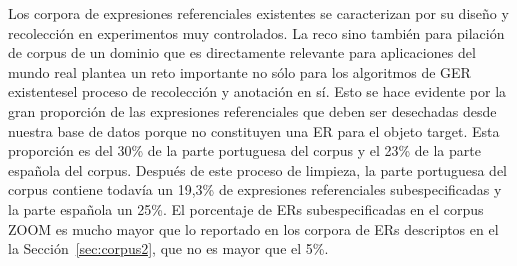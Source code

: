 


Los corpora de expresiones referenciales existentes se caracterizan por su dise\~no y recolecci\'on en experimentos muy controlados. La reco sino tambi\'en para pilaci\'on de corpus de un dominio que es directamente relevante para aplicaciones del mundo real plantea un reto importante no s\'olo para los algoritmos de GER existentesel proceso de recolecci\'on y anotaci\'on en s\'{i}. Esto se hace evidente por la gran proporci\'on de las expresiones referenciales que deben ser desechadas desde nuestra base de datos porque no constituyen una ER para el objeto target. Esta proporci\'on es del 30\% de la parte portuguesa del corpus y el 23\% de la parte espa\~nola del corpus.
Despu\'es de este proceso de limpieza, la parte portuguesa del corpus contiene todav\'{i}a un 19,3\% de expresiones referenciales subespecificadas y la parte espa\~nola un 25\%. El porcentaje de ERs subespecificadas en el corpus ZOOM es mucho mayor que lo reportado en los corpora de ERs descriptos en el la Secci\'on~\ref{sec:corpus2}, que no es mayor que el 5\%. 

